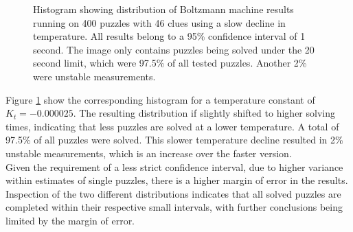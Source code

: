 \documentclass[a4paper,11pt]{kth-mag}
\begin{document}
\begin{figure}[here] 
\noindent{}
\vspace{-15pt}
\caption[Histogram with distribution of Boltzmann machine with slow decline]{Histogram showing distribution of Boltzmann machine results running on 400 puzzles with 46 clues using a slow decline in temperature. All results belong to a 95\% confidence interval of 1 second. The image only contains puzzles being solved under the 20 second limit, which were 97.5\% of all tested puzzles. Another 2\% were unstable measurements.}
\label{fig:boltzmannMedium}
\end{figure}

Figure \ref{fig:boltzmannMedium} show the corresponding histogram for a temperature constant of $K_t = -0.000025$.
The resulting distribution if slightly shifted to higher solving times, indicating that less puzzles are solved at a lower temperature.
A total of 97.5\% of all puzzles were solved.
This slower temperature decline resulted in 2\% unstable measurements, which is an increase over the faster version. \\

Given the requirement of a less strict confidence interval, due to higher variance within estimates of single puzzles, there is a higher margin of error in the results.
Inspection of the two different distributions indicates that all solved puzzles are completed within their respective small intervals, with further conclusions being limited by the margin of error. \\
\end{document}
